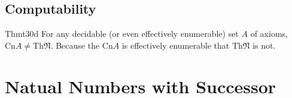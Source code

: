 \subsection*{Computability}

\begin{reference}{Thm}{t30d}
  For any decidable (or even effectively enumerable) set $A$ of axioms, $\mathrm{Cn}A\neq \mathrm{Th}\mathfrak N$. Because the $\mathrm{Cn}A$ is effectively enumerable that $\mathrm{Th}\mathfrak N$ is not.
\end{reference}


\section{Natual Numbers with Successor}

